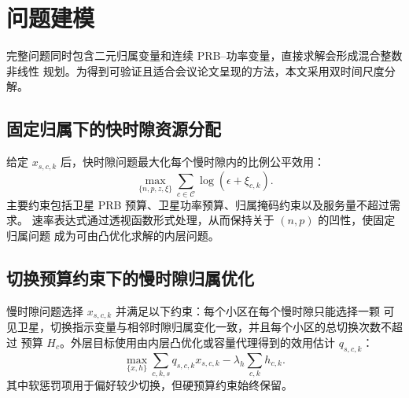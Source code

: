 
\section{问题建模}

完整问题同时包含二元归属变量和连续 PRB--功率变量，直接求解会形成混合整数非线性
规划。为得到可验证且适合会议论文呈现的方法，本文采用双时间尺度分解。

\subsection{固定归属下的快时隙资源分配}

给定 $x_{s,c,k}$ 后，快时隙问题最大化每个慢时隙内的比例公平效用：
\begin{equation}
    \max_{\{n,p,z,\xi\}}
    \sum_{c\in\mathcal{C}}\log(\epsilon+\xi_{c,k}).
\end{equation}
主要约束包括卫星 PRB 预算、卫星功率预算、归属掩码约束以及服务量不超过需求。
速率表达式通过透视函数形式处理，从而保持关于 $(n,p)$ 的凹性，使固定归属问题
成为可由凸优化求解的内层问题。

\subsection{切换预算约束下的慢时隙归属优化}

慢时隙问题选择 $x_{s,c,k}$ 并满足以下约束：每个小区在每个慢时隙只能选择一颗
可见卫星，切换指示变量与相邻时隙归属变化一致，并且每个小区的总切换次数不超过
预算 $H_c$。外层目标使用由内层凸优化或容量代理得到的效用估计 $q_{s,c,k}$：
\begin{equation}
    \max_{\{x,h\}}
    \sum_{c,k,s} q_{s,c,k}x_{s,c,k}
    -\lambda_h\sum_{c,k}h_{c,k}.
\end{equation}
其中软惩罚项用于偏好较少切换，但硬预算约束始终保留。
